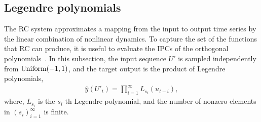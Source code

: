 \documentclass{article}
\begin{document}
\begin{comment}
  + \frac{1}{ \mathbb{E}[X(U')^2]^2 } \, \mathbb{V} \left[ \left< X(U') \right>_m \, \left< X(U') \right>_n \right] \nonumber \\
  &- \frac{ \mathbb{E}[X(U')^2]^2 }{ \mathbb{E}[X(U')^2]^4 } \, {\rm Cov} \left( \left< X(U') \right>_n^2 \, , 
           \left< X(U') \right>_m \, \left< X(U') \right>_n \right)
  + o\left(\frac{1}{n}\right) \nonumber \\
  =& \frac{1}{4} \, \mathbb{V} \left[ \left< X(U') \right>_n^2 \right]
  + \frac{1}{ \mathbb{E}[X(U')^2]^2 } \, \mathbb{V} \left[ \left< X(U') \right>_m \, \left< X(U') \right>_n \right] \nonumber \\
  &- \frac{1}{ \mathbb{E}[X(U')^2]^2 } \, {\rm Cov} \left( \left< X(U') \right>_n^2 \, , 
           \left< X(U') \right>_m \, \left< X(U') \right>_n \right)
  + o\left(\frac{1}{n}\right) \nonumber \\
  =& \frac{1}{4} \, \mathbb{V} \left[ \frac{1}{n^2} \left( \sum_{i=1}^n X(U'_i) \right)^2 \right]
  + o\left(\frac{1}{n}\right) 
  = \frac{1}{4 n^4} \, \mathbb{V} \left[ \left( \sum_{i=1}^n X(U'_i) \right)^2 \right]
  + o\left(\frac{1}{n}\right) \nonumber \\
  =& \frac{1}{4 n^4} \, \left[ n \, \mathbb{V} [X(U'_1)] + 2(n-1) \, {\rm Cov}(X(U'_1), X(U'_2)) 
 + \cdots + 2 \, {\rm Cov}(X(U'_1), X(U'_n)) \right]
  + o\left(\frac{1}{n}\right) \nonumber \\
 =& \frac{V_\infty}{4 n^3} + o\left(\frac{1}{n}\right)
 = \frac{1}{3 n^3} + o\left(\frac{1}{n}\right) \, . 
\end{align}
The asymptotic form is 
\begin{align}
 E'_{\rm M, asym} =& L(w_0) + \frac{3}{2n} + o\left(\frac{1}{n}\right) \, , \\
 V'_{\rm iid, asym} =& 0 + o\left(\frac{1}{n}\right) = o\left(\frac{1}{n}\right) \, , 
\end{align}
and we find that these are consistent to the exact form up to $O(1/n)$. 
\end{comment}

 \subsection{Legendre polynomials}
\begin{comment}
・先行研究に倣って直交多項式のIPCを計算。
・IPC ~ 1 の例と IPC ~ 0 の例を示し、評価の正しさを見る。
\end{comment} 
The RC system approximates a mapping from the input to output time series by the linear combination of nonlinear dynamics. 
To capture the set of the functions that RC can produce, it is useful to evaluate the IPCs of the orthogonal polynomials~\cite{dambre2012information, kubota2021unifying}. 
In this subsection, the input sequence $U'$ is sampled independently from ${\rm Uniform}(-1, 1)$, and the target output is the product of Legendre polynomials, 
\begin{align}
\hat{y}(U'_t) = \prod_{i=1}^\infty L_{s_i}(u_{t-i}), 
\end{align}
where, $L_{s_i}$ is the $s_i$-th Legendre polynomial, and the number of nonzero elements in $(s_i)_{i=1}^\infty$ is finite. 
\end{document}
